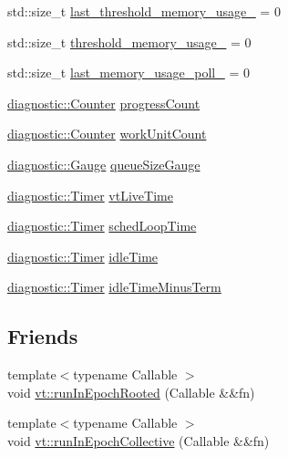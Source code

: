 \begin{DoxyCompactItemize}
\item 
std\+::size\+\_\+t \hyperlink{structvt_1_1sched_1_1_scheduler_a49a7b0137e9096d9197d8a664eb28bf2}{last\+\_\+threshold\+\_\+memory\+\_\+usage\+\_\+} = 0
\item 
std\+::size\+\_\+t \hyperlink{structvt_1_1sched_1_1_scheduler_a034c9560a2d4d8f60b3ddab063abe16d}{threshold\+\_\+memory\+\_\+usage\+\_\+} = 0
\item 
std\+::size\+\_\+t \hyperlink{structvt_1_1sched_1_1_scheduler_a54f31a009c8abdf8b9f220832b25f668}{last\+\_\+memory\+\_\+usage\+\_\+poll\+\_\+} = 0
\item 
\hyperlink{namespacevt_1_1diagnostic_a55fcc9d6ffa285d1b085c01df2507d2f}{diagnostic\+::\+Counter} \hyperlink{structvt_1_1sched_1_1_scheduler_acb82ca3c712cf5c36bce05c2ef8b53ad}{progress\+Count}
\item 
\hyperlink{namespacevt_1_1diagnostic_a55fcc9d6ffa285d1b085c01df2507d2f}{diagnostic\+::\+Counter} \hyperlink{structvt_1_1sched_1_1_scheduler_a1b22d8a8efd0cb27fdba01ae616e060b}{work\+Unit\+Count}
\item 
\hyperlink{namespacevt_1_1diagnostic_ad68069af499e2047c28d1852d77680ee}{diagnostic\+::\+Gauge} \hyperlink{structvt_1_1sched_1_1_scheduler_afd3dfb9290dd31015056f4a89e447325}{queue\+Size\+Gauge}
\item 
\hyperlink{namespacevt_1_1diagnostic_a84795feb3d3500ee2d7d59248499efb8}{diagnostic\+::\+Timer} \hyperlink{structvt_1_1sched_1_1_scheduler_adce0ae8437702f0aa29cbdea4fd58a12}{vt\+Live\+Time}
\item 
\hyperlink{namespacevt_1_1diagnostic_a84795feb3d3500ee2d7d59248499efb8}{diagnostic\+::\+Timer} \hyperlink{structvt_1_1sched_1_1_scheduler_a89fb2b5f6ab5c29aed1db7a6a924eb13}{sched\+Loop\+Time}
\item 
\hyperlink{namespacevt_1_1diagnostic_a84795feb3d3500ee2d7d59248499efb8}{diagnostic\+::\+Timer} \hyperlink{structvt_1_1sched_1_1_scheduler_a5ccba45f9944b59236f7802f974b252e}{idle\+Time}
\item 
\hyperlink{namespacevt_1_1diagnostic_a84795feb3d3500ee2d7d59248499efb8}{diagnostic\+::\+Timer} \hyperlink{structvt_1_1sched_1_1_scheduler_a86c062f0d1dce9656dce8af9875cee73}{idle\+Time\+Minus\+Term}
\end{DoxyCompactItemize}
\subsection*{Friends}
\begin{DoxyCompactItemize}
\item 
{\footnotesize template$<$typename Callable $>$ }\\void \hyperlink{structvt_1_1sched_1_1_scheduler_a792343e9a39ba8661b35c3c9e55f3541}{vt\+::run\+In\+Epoch\+Rooted} (Callable \&\&fn)
\item 
{\footnotesize template$<$typename Callable $>$ }\\void \hyperlink{structvt_1_1sched_1_1_scheduler_a71bf858d697b14435f4b7e525d2dffde}{vt\+::run\+In\+Epoch\+Collective} (Callable \&\&fn)
\end{DoxyCompactItemize}
